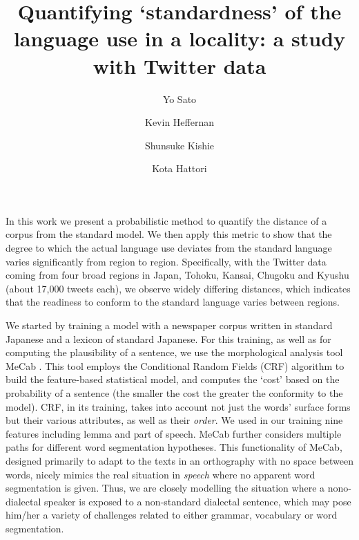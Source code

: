 \documentclass[a4,12pt]{article}
\title{Quantifying `standardness' of the language use in a locality: a study with Twitter data}
\begin{document}
\pagestyle{empty}

\date{}

\renewcommand\Authfont{\fontsize{14}{14.4}\selectfont}
\renewcommand\Affilfont{\fontsize{14}{10.8}\itshape}

\author{Yo Sato}
\author{Kevin Heffernan}

\author{Shunsuke Kishie}
\author{Kota Hattori}

\small\maketitle{}




\thispagestyle{empty}

In this work we present a probabilistic method to quantify the distance of a corpus from the standard model. We then apply this metric to show that the degree to which the actual language use deviates from the standard language varies significantly from region to region. Specifically, with the Twitter data coming from four broad regions in Japan, Tohoku, Kansai, Chugoku and Kyushu (about 17,000 tweets each), we observe widely differing distances, which indicates that the readiness to conform to the standard language varies between regions.

We started by training a model with a newspaper corpus written in standard Japanese and a lexicon of standard Japanese. For this training, as well as for computing the plausibility of a sentence, we use the morphological analysis tool MeCab \cite{KudoEtAl04}. This tool employs the Conditional Random Fields (CRF) algorithm \cite{LaffertyEtAl01_CRF} to build the feature-based statistical model, and computes the `cost' based on the probability of a sentence (the smaller the cost the greater the conformity to the model). CRF, in its training, takes into account not just the words' surface forms but their various attributes, as well as their \emph{order}. We used in our training nine features including lemma and part of speech. MeCab further considers multiple paths for different word segmentation hypotheses. This functionality of MeCab, designed primarily to adapt to the texts in an orthography with no space between words, nicely mimics the real situation in \emph{speech} where no apparent word segmentation is given. Thus, we are closely modelling the situation where a nono-dialectal speaker is exposed to a non-standard dialectal sentence, which may pose him/her a variety of challenges related to either grammar, vocabulary or word segmentation.
\end{document}
